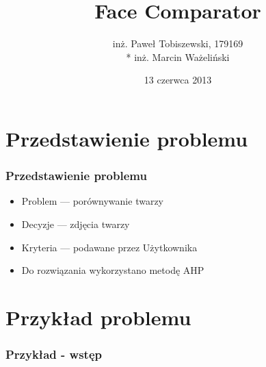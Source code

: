 \documentclass{beamer}
\title{Face Comparator}
\author[PT MZ]{
	inż. Paweł Tobiszewski, 179169\\*
	inż. Marcin Ważeliński
}
\institute[PWr]{Wydział Informatyki i Zarządzania, Politechnika Wrocławska}
\date{13 czerwca 2013}
\begin{document}
\begin{frame}
	\titlepage
\end{frame}

\section{Przedstawienie problemu}
\begin{frame}
\frametitle{Przedstawienie problemu}
	\begin{itemize}
	\item Problem --- porównywanie twarzy
	\item Decyzje --- zdjęcia twarzy
	\item Kryteria --- podawane przez Użytkownika
	\item Do rozwiązania wykorzystano metodę AHP
	\end{itemize}
\end{frame}

\section{Przykład problemu}
\begin{frame}
\frametitle{Przykład - wstęp}
\end{frame}
\end{document}
